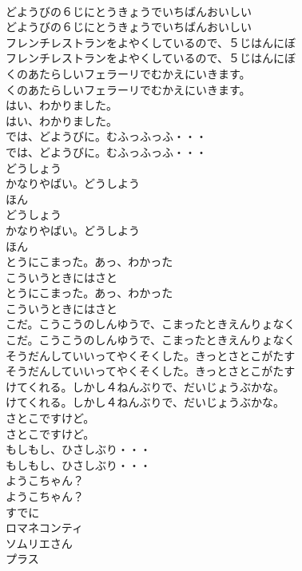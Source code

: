 \documentclass[8pt]{extreport}
\begin{document}
\begin{CJK}{UTF8}{min}
\\	どようびの６じにとうきょうでいちばんおいしい
\\	どようびの６じにとうきょうでいちばんおいしい
\\	フレンチレストランをよやくしているので、５じはんにぼ
\\	フレンチレストランをよやくしているので、５じはんにぼ
\\	くのあたらしいフェラーリでむかえにいきます。
\\	くのあたらしいフェラーリでむかえにいきます。
\\	はい、わかりました。
\\	はい、わかりました。
\\	では、どようびに。むふっふっふ・・・
\\	では、どようびに。むふっふっふ・・・
\\	どうしょう
\\	かなりやばい。どうしよう
\\	ほん
\\	どうしょう
\\	かなりやばい。どうしよう
\\	ほん
\\	とうにこまった。あっ、わかった
\\	こういうときにはさと
\\	とうにこまった。あっ、わかった
\\	こういうときにはさと
\\	こだ。こうこうのしんゆうで、こまったときえんりょなく
\\	こだ。こうこうのしんゆうで、こまったときえんりょなく
\\	そうだんしていいってやくそくした。きっとさとこがたす
\\	そうだんしていいってやくそくした。きっとさとこがたす
\\	けてくれる。しかし４ねんぶりで、だいじょうぶかな。
\\	けてくれる。しかし４ねんぶりで、だいじょうぶかな。
\\	さとこですけど。
\\	さとこですけど。
\\	もしもし、ひさしぶり・・・
\\	もしもし、ひさしぶり・・・
\\	ようこちゃん？
\\	ようこちゃん？
\\	すでに
\\	ロマネコンティ
\\	ソムリエさん
\\	プラス

\end{CJK}
\end{document}
